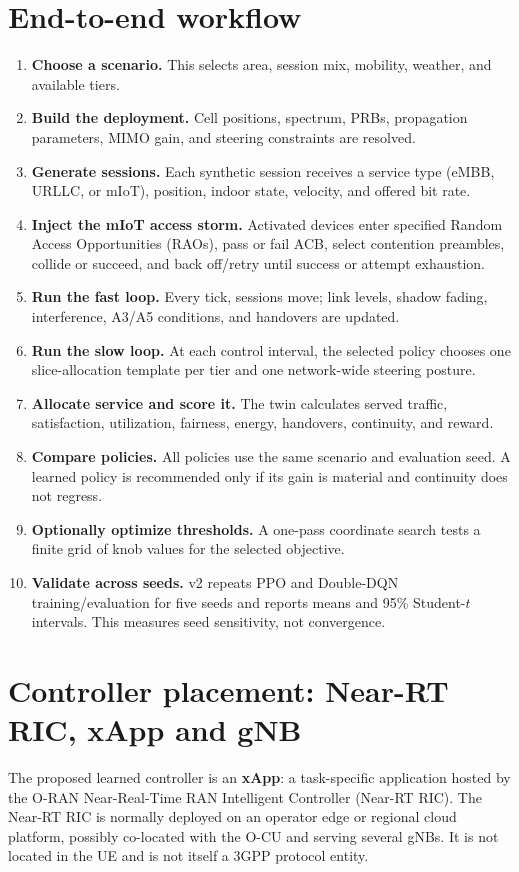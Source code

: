 \documentclass[10pt]{article}
\begin{document}
\section{End-to-end workflow}
\begin{enumerate}
  \item \textbf{Choose a scenario.} This selects area, session mix, mobility, weather, and available tiers.
  \item \textbf{Build the deployment.} Cell positions, spectrum, PRBs, propagation parameters, MIMO gain, and steering constraints are resolved.
  \item \textbf{Generate sessions.} Each synthetic session receives a service type (eMBB, URLLC, or mIoT), position, indoor state, velocity, and offered bit rate.
  \item \textbf{Inject the mIoT access storm.} Activated devices enter specified Random Access Opportunities (RAOs), pass or fail ACB, select contention preambles, collide or succeed, and back off/retry until success or attempt exhaustion.
  \item \textbf{Run the fast loop.} Every tick, sessions move; link levels, shadow fading, interference, A3/A5 conditions, and handovers are updated.
  \item \textbf{Run the slow loop.} At each control interval, the selected policy chooses one slice-allocation template per tier and one network-wide steering posture.
  \item \textbf{Allocate service and score it.} The twin calculates served traffic, satisfaction, utilization, fairness, energy, handovers, continuity, and reward.
  \item \textbf{Compare policies.} All policies use the same scenario and evaluation seed. A learned policy is recommended only if its gain is material and continuity does not regress.
  \item \textbf{Optionally optimize thresholds.} A one-pass coordinate search tests a finite grid of knob values for the selected objective.
  \item \textbf{Validate across seeds.} v2 repeats PPO and Double-DQN training/evaluation for five seeds and reports means and 95\% Student-$t$ intervals. This measures seed sensitivity, not convergence.
\end{enumerate}

\section{Controller placement: Near-RT RIC, xApp and gNB}
The proposed learned controller is an \textbf{xApp}: a task-specific application hosted by the O-RAN Near-Real-Time RAN Intelligent Controller (Near-RT RIC). The Near-RT RIC is normally deployed on an operator edge or regional cloud platform, possibly co-located with the O-CU and serving several gNBs. It is not located in the UE and is not itself a 3GPP protocol entity.
\end{document}
